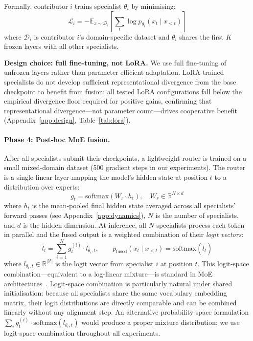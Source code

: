 \documentclass{article}
\begin{document}
Formally, contributor $i$ trains specialist $\theta_i$ by minimising:
\[
\mathcal{L}_i = -\mathbb{E}_{x \sim \mathcal{D}_i} \left[\sum_t \log p_{\theta_i}(x_t \mid x_{<t})\right]
\]
where $\mathcal{D}_i$ is contributor $i$'s domain-specific dataset and $\theta_i$ shares the first $K$ frozen layers with all other specialists.

\textbf{Design choice: full fine-tuning, not LoRA.} We use full fine-tuning of unfrozen layers rather than parameter-efficient adaptation. LoRA-trained specialists do not develop sufficient representational divergence from the base checkpoint to benefit from fusion: all tested LoRA configurations fall below the empirical divergence floor required for positive gains, confirming that representational divergence---not parameter count---drives cooperative benefit (Appendix~\ref{app:design}, Table~\ref{tab:lora}).

\paragraph{Phase 4: Post-hoc MoE fusion.} After all specialists submit their checkpoints, a lightweight router is trained on a small mixed-domain dataset (500 gradient steps in our experiments). The router is a single linear layer mapping the model's hidden state at position $t$ to a distribution over experts:
\[
g_t = \mathrm{softmax}\left(W_r \cdot h_t\right), \quad W_r \in \mathbb{R}^{N \times d}
\]
where $h_t$ is the mean-pooled final hidden state averaged across all specialists' forward passes (see Appendix~\ref{app:dynamics}), $N$ is the number of specialists, and $d$ is the hidden dimension. At inference, all $N$ specialists process each token in parallel and the fused output is a weighted combination of their \emph{logit vectors}:
\[
\tilde{l}_t = \sum_{i=1}^{N} g_t^{(i)} \cdot l_{\theta_i,t}, \qquad
p_\text{fused}(x_t \mid x_{<t}) = \mathrm{softmax}\!\left(\tilde{l}_t\right)
\]
where $l_{\theta_i,t} \in \mathbb{R}^{|\mathcal{V}|}$ is the logit vector from specialist $i$ at position $t$. This logit-space combination---equivalent to a log-linear mixture---is standard in MoE architectures~\citep{shazeer2017outrageously,jiang2024mixtral}. Logit-space combination is particularly natural under shared initialisation: because all specialists share the same vocabulary embedding matrix, their logit distributions are directly comparable and can be combined linearly without any alignment step. An alternative probability-space formulation $\sum_i g_t^{(i)} \cdot \mathrm{softmax}(l_{\theta_i,t})$ would produce a proper mixture distribution; we use logit-space combination throughout all experiments.
\end{document}
